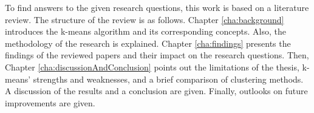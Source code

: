 To find answers to the given research questions, this work is based on a literature review.
The structure of the review is as follows.
Chapter \ref{cha:background} introduces the k-means algorithm and its corresponding concepts.
Also, the methodology of the research is explained.
Chapter \ref{cha:findings} presents the findings of the reviewed papers and their impact on the research questions.
Then, Chapter \ref{cha:discussionAndConclusion} points out the limitations of the thesis, k-means' strengths and weaknesses, and a brief comparison of clustering methods.
A discussion of the results and a conclusion are given.
Finally, outlooks on future improvements are given.
